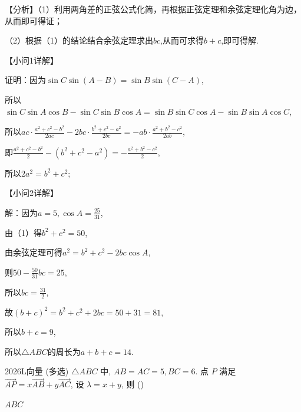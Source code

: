 \documentclass[12pt,UTF-8,a4paper]{ctexart}
\numberwithin{figure}{section}
\theoremstyle{mystyle}
\theoremstyle{mystylekaishu}
\theoremstyle{mystyle}
\numberwithin{xiti}{section}
\begin{document}
\begin{solutions}
【分析】（1）利用两角差的正弦公式化简，再根据正弦定理和余弦定理化角为边，从而即可得证；

（2）根据（1）的结论结合余弦定理求出$bc$,从而可求得$b+c$,即可得解.

【小问1详解】

证明：因为$\sin C\sin(A-B)=\sin B\sin(C-A)$,

所以$\sin C\sin A\cos B-\sin C\sin B\cos A=\sin B\sin C\cos A-\sin B\sin A\cos C$,

所以$ac\cdot\frac{a^2+c^2-b^2}{2ac}-2bc\cdot\frac{b^2+c^2-a^2}{2bc}=-ab\cdot\frac{a^2+b^2-c^2}{2ab}$,

即$\frac{a^2+c^2-b^2}{2}-\left(b^2+c^2-a^2\right)=-\frac{a^2+b^2-c^2}{2}$,

所以$2a^2=b^2+c^2$;

【小问2详解】

解：因为$a=5,\cos A=\frac{25}{31}$,

由（1）得$b^2+c^2=50$,

由余弦定理可得$a^2=b^2+c^2-2bc\cos A$,

则$50-\frac{50}{31}bc=25$,

所以$bc=\frac{31}{2}$,

故$(b+c)^2=b^2+c^2+2bc=50+31=81$,

所以$b+c=9$,

所以$\triangle ABC$的周长为$a+b+c=14$.
\end{solutions}


\begin{problem}{2026}{L}{}{}{向量}
(多选) $\triangle ABC$ 中, $AB=AC=5, BC=6$. 点 $P$ 满足 $\overrightarrow{AP}=x \overrightarrow{AB}+y \overrightarrow{AC}$, 设 $\lambda=x+y$, 则 (\hspace{1cm})
\begin{choices}
\end{choices}
\end{problem}

\begin{answer}
$ABC$
\end{answer}
\end{document}
